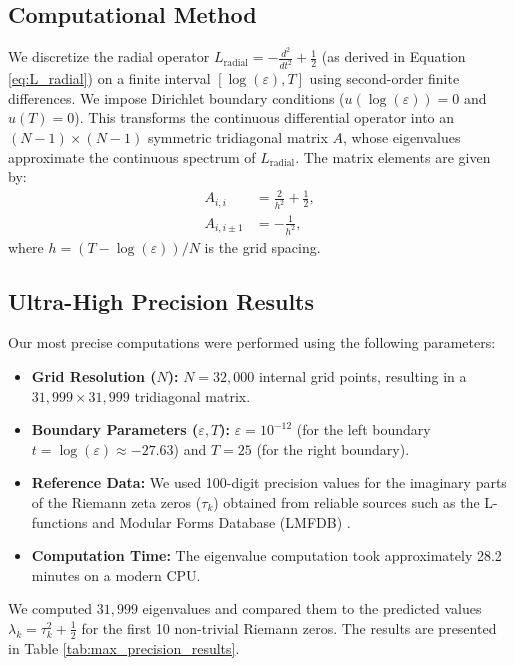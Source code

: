 \documentclass[12pt]{article}
\begin{document}
\subsection{Computational Method}
We discretize the radial operator $L_{\text{radial}} = -\frac{d^2}{dt^2} + \frac{1}{2}$ (as derived in Equation \ref{eq:L_radial}) on a finite interval $[\log(\varepsilon), T]$ using second-order finite differences. We impose Dirichlet boundary conditions ($u(\log(\varepsilon)) = 0$ and $u(T) = 0$). This transforms the continuous differential operator into an $(N-1) \times (N-1)$ symmetric tridiagonal matrix $A$, whose eigenvalues approximate the continuous spectrum of $L_{\text{radial}}$.
The matrix elements are given by:
\begin{align*}
A_{i,i} &= \frac{2}{h^2} + \frac{1}{2}, \\
A_{i,i \pm 1} &= -\frac{1}{h^2},
\end{align*}
where $h = (T - \log(\varepsilon))/N$ is the grid spacing.

\subsection{Ultra-High Precision Results}
Our most precise computations were performed using the following parameters:
\begin{itemize}
    \item \textbf{Grid Resolution ($N$):} $N = 32{,}000$ internal grid points, resulting in a $31{,}999 \times 31{,}999$ tridiagonal matrix.
    \item \textbf{Boundary Parameters ($\varepsilon, T$):} $\varepsilon = 10^{-12}$ (for the left boundary $t = \log(\varepsilon) \approx -27.63$) and $T = 25$ (for the right boundary).
    \item \textbf{Reference Data:} We used 100-digit precision values for the imaginary parts of the Riemann zeta zeros ($\tau_k$) obtained from reliable sources such as the L-functions and Modular Forms Database (LMFDB) \cite{lmfdb2020}.
    \item \textbf{Computation Time:} The eigenvalue computation took approximately 28.2 minutes on a modern CPU.
\end{itemize}
We computed $31{,}999$ eigenvalues and compared them to the predicted values $\lambda_k = \tau_k^2 + \frac{1}{2}$ for the first 10 non-trivial Riemann zeros. The results are presented in Table \ref{tab:max_precision_results}.
\end{document}
